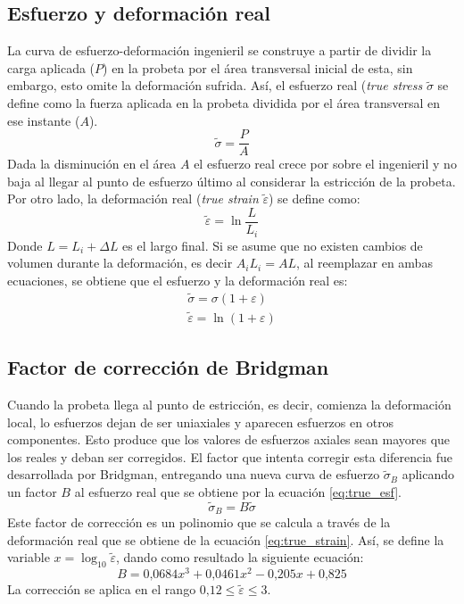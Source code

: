 \subsection{Esfuerzo y deformación real}
La curva de esfuerzo-deformación ingenieril se construye a partir de dividir la carga aplicada ($P$) en la probeta por el área transversal inicial de esta, sin embargo, esto omite la deformación sufrida. Así, el esfuerzo real (\textit{true stress} $\tilde{\sigma}$ se define como la fuerza aplicada en la probeta dividida por el área transversal en ese instante ($A$). 
\begin{equation}
	\tilde{\sigma} = \frac{P}{A}
\end{equation} 
Dada la disminución en el área $A$ el esfuerzo real crece por sobre el ingenieril y no baja al llegar al punto de esfuerzo último al considerar la estricción de la probeta. Por otro lado, la deformación real (\textit{true strain} $\tilde{\varepsilon}$) se define como:
\begin{equation}
	\tilde{\varepsilon} = \ln\frac{L}{L_i}
\end{equation}
Donde $L=L_i + \Delta L$ es el largo final. Si se asume que no existen cambios de volumen durante la deformación, es decir $A_iL_i = AL$,  al reemplazar en ambas ecuaciones, se obtiene que el esfuerzo y la deformación real es:
\begin{gather}
	\tilde{\sigma} = \sigma(1 + \varepsilon) \label{eq:true_esf}\\
	\tilde{\varepsilon} = \ln (1 + \varepsilon) \label{eq:true_strain}
\end{gather}

\subsection{Factor de corrección de Bridgman}
Cuando la probeta llega al punto de estricción, es decir, comienza la deformación local, lo esfuerzos dejan de ser uniaxiales y aparecen esfuerzos en otros componentes. Esto produce que los valores de esfuerzos axiales sean mayores que los reales y deban ser corregidos. El factor que intenta corregir esta diferencia fue desarrollada por Bridgman, entregando una nueva curva de esfuerzo $\tilde{\sigma}_B$ aplicando un factor $B$ al esfuerzo real que se obtiene por la ecuación \ref{eq:true_esf}. 
\begin{equation}
	\tilde{\sigma}_B = B\tilde{\sigma}
\end{equation}
Este factor de corrección es un polinomio que se calcula a través de la deformación real que se obtiene de la ecuación \ref{eq:true_strain}. Así, se define la variable $x = \log_{10} \tilde{\varepsilon}$, dando como resultado la siguiente ecuación:
\begin{equation}
B = 0\text{,}0684x^3 + 0\text{,}0461x^2 - 0\text{,}205x + 0\text{,}825 
\end{equation}
La corrección se aplica en el rango $0\text{,}12 \leq \tilde{\varepsilon} \leq 3$.

